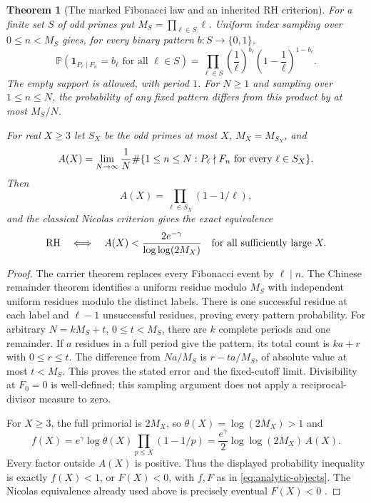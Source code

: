 \documentclass[11pt]{article}
\newtheorem{theorem}{Theorem}[section]
\theoremstyle{definition}
\begin{document}
\begin{theorem}[The marked Fibonacci law and an inherited RH criterion]
\label{thm:fibonacci-marked-nicolas}
For a finite set $S$ of odd primes put $M_S=\prod_{\ell\in S}\ell$.
Uniform index sampling over $0\le n<M_S$ gives, for every binary
pattern $b:S\to\{0,1\}$,
\[
 \mathbb P\!\left(
   \boldsymbol{1}_{P_\ell\mid F_n}=b_\ell
   \text{ for all }\ell\in S\right)
 =
 \prod_{\ell\in S}
   \left(\frac1\ell\right)^{b_\ell}
   \left(1-\frac1\ell\right)^{1-b_\ell}.
\]
The empty support is allowed, with period $1$.
For $N\ge1$ and sampling over $1\le n\le N$, the probability of any fixed
pattern differs from this product by at most $M_S/N$.

For real $X\ge3$ let $S_X$ be the odd primes at most $X$,
$M_X=M_{S_X}$, and
\[
 A(X)=\lim_{N\to\infty}\frac1N
   \#\{1\le n\le N:
       P_\ell\nmid F_n\ \hbox{for every }\ell\in S_X\}.
\]
Then
\[
 A(X)=\prod_{\ell\in S_X}(1-1/\ell),
\]
and the classical Nicolas criterion gives the exact equivalence
\[
 \mathrm{RH}
 \quad\Longleftrightarrow\quad
 A(X)<\frac{2e^{-\gamma}}{\log\log(2M_X)}
 \quad\hbox{for all sufficiently large }X.
\]
\end{theorem}

\begin{proof}
The carrier theorem replaces every Fibonacci event by $\ell\mid n$.
The Chinese remainder theorem identifies a uniform residue modulo
$M_S$ with independent uniform residues modulo the distinct labels.
There is one successful residue at each label and $\ell-1$
unsuccessful residues, proving every pattern probability.
For arbitrary $N=kM_S+t$, $0\le t<M_S$, there are $k$ complete
periods and one remainder. If $a$ residues in a full period give
the pattern, its total count is $ka+r$ with $0\le r\le t$.
The difference from $Na/M_S$ is $r-ta/M_S$, of absolute value
at most $t<M_S$. This proves the stated error and the fixed-cutoff
limit. Divisibility at $F_0=0$ is well-defined; this sampling
argument does not apply a reciprocal-divisor measure to zero.

For $X\ge3$, the full primorial is $2M_X$, so
$\theta(X)=\log(2M_X)>1$ and
\[
 f(X)=e^\gamma\log\theta(X)
          \prod_{p\le X}(1-1/p)
      =\frac{e^\gamma}{2}\log\log(2M_X)\,A(X).
\]
Every factor outside $A(X)$ is positive. Thus the displayed
probability inequality is exactly $f(X)<1$, or $F(X)<0$,
with $f,F$ as in \eqref{eq:analytic-objects}.
The Nicolas equivalence already used above is precisely
eventual $F(X)<0$ \cite{Nicolas1983,Nicolas2012}.
\end{proof}
\end{document}
